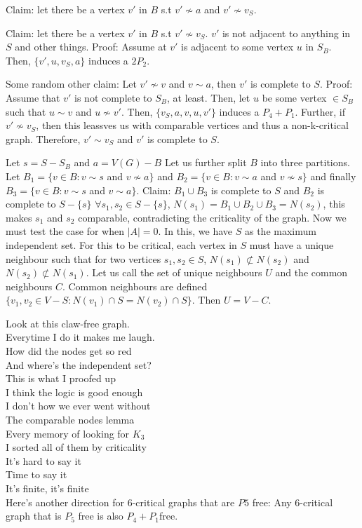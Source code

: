 \documentclass[12pt]{article}
\begin{document}
Claim: let there be a vertex $v'$ in $B$ s.t $v' \not \sim a$ and $v' \not \sim v_S$.

Claim: let there be a vertex $v'$ in $B$ s.t $v' \not \sim v_S$. $v'$ is not adjacent to anything in $S$ and other things.
Proof: Assume at $v'$ is adjacent to some vertex $u$ in $S_B$. Then, $\{ v', u, v_S, a \}$ induces a $2P_2$.

Some random other claim: Let $v' \not \sim v$ and $v \sim a$, then $v'$ is complete to $S$.
Proof: Assume that $v'$ is not complete to $S_B$, at least. Then, let $u$ be some vertex $\in S_B$ such that $u \sim v$ and $u \not \sim v'$. Then, $\{v_S, a, v, u, v' \}$ induces a $P_4 + P_1$. Further, if $v' \not \sim v_S$, then this leassves us with comparable vertices and thus a non-k-critical graph. Therefore, $v' \sim v_S$ and $v'$ is complete to $S$.

Let $s = S - S_B$ and $a = V(G) - B$
Let us further split $B$ into three partitions. Let $B_1 = \{v \in B : v \sim s$ and $v \not \sim a \}$ and $B_2  =\{v \in B : v \sim a$ and $v \not \sim s \}$ and finally $B_3 = \{v \in B : v \sim s$ and $v \sim a \}$.
Claim: $B_1 \cup B_3$ is complete to $S$ and $B_2$ is complete to $S - \{s\}$
$\forall s_1, s_2 \in S - \{ s \}$, $N(s_1) = B_1 \cup B_2 \cup B_3 = N(s_2)$, this makes $s_1$ and $s_2$ comparable, contradicting the criticality of the graph.
%
Now we must test the case for when $|A| = 0$. In this, we have $S$ as the maximum independent set. For this to be critical, each vertex in $S$ must have a unique neighbour such that for two vertices $s_1, s_2 \in S$, $N(s_1) \not \subset N(s_2)$ and $N(s_2) \not \subset N(s_1)$.
Let us call the set of unique neighbours $U$ and the common neighbours $C$.
Common neighbours are defined $\{ v_1, v_2 \in V - S : N(v_1) \cap S = N(v_2) \cap S \}$. Then $U = V - C$.

Look at this claw-free graph.\\
Everytime I do it makes me laugh.\\
How did the nodes get so red\\
And where's the independent set?\\

This is what I proofed up\\
I think the logic is good enough\\
I don't how we ever went without\\
The comparable nodes lemma\\



Every memory of looking for $K_3$\\
I sorted all of them by criticality\\
It's hard to say it\\
Time to say it\\
It's finite, it's finite\\



Here's another direction for 6-critical graphs that are $P5$ free: Any 6-critical graph that is $P_5$ free is also $P_4 + P_1 $free.

{}

\end{document}

